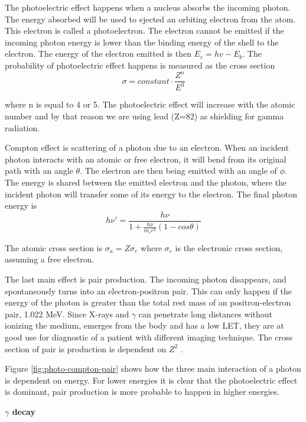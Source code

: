 \documentclass[twoside,english]{uiofysmaster/uiofysmaster}
\begin{document}
The photoelectric effect happens when a nucleus absorbs the incoming photon. The energy absorbed will be used to ejected an orbiting electron from the atom. This electron is called a photoelectron\cite{nuclearchem}. The electron cannot be emitted if the incoming photon energy is lower than the binding energy of the shell to the electron. The energy of the electron emitted is then $E_e = hv - E_b$. The probability of photoelectric effect happens is measured as the cross section 
\begin{equation}
\sigma = constant \cdot \frac{Z^n}{E^3}
\end{equation}

where n is equal to 4 or 5\cite{Radiological_physics}. The photoelectric effect will increase with the atomic number and by that reason we are using lead (Z=82) as shielding for gamma radiation. 

Compton effect is scattering of a photon due to an electron. When an incident photon interacts with an atomic or free electron, it will bend from its original path with an angle $\theta$. The electron are then being emitted with an angle of $\phi$.
The energy is shared between the emitted electron and the photon, where the incident photon will transfer some of its energy to the electron. The final photon energy is \begin{equation}
h\nu' = \frac{h\nu}{1 + \frac{h\nu}{m_ec^2} (1-cos\theta)}
\end{equation}

The atomic cross section is $\sigma_a = Z \sigma_e$ where $\sigma_e$ is the electronic cross section, assuming a free electron\cite{nuclearchem}.

The last main effect is pair production. The incoming photon disappears, and spontaneously turns into an electron-positron pair. This can only happen if the energy of the photon is greater than the total rest mass of an positron-electron pair, 1.022 MeV. Since X-rays and $\gamma$ can penetrate long distances without ionizing the medium, emerges from the body and has a low LET, they are at good use for diagnostic of a patient with different imaging technique. 
The cross section of pair is production is dependent on $Z^2$ .


Figure \ref{fig:photo-compton-pair} shows how the three main interaction of a photon is dependent on energy. For lower energies it is clear that the photoelectric effect is dominant, pair production is more probable to happen in higher energies.


\textbf{$\gamma$ decay}
\end{document}
